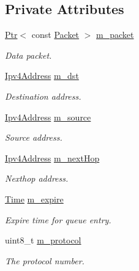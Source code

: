 \subsection*{Private Attributes}
\begin{DoxyCompactItemize}
\item 
\hyperlink{classns3_1_1Ptr}{Ptr}$<$ const \hyperlink{classns3_1_1Packet}{Packet} $>$ \hyperlink{classns3_1_1dsr_1_1DsrErrorBuffEntry_a5304a0bf201540812692d0249f5f96b6}{m\+\_\+packet}
\begin{DoxyCompactList}\small\item\em Data packet. \end{DoxyCompactList}\item 
\hyperlink{classns3_1_1Ipv4Address}{Ipv4\+Address} \hyperlink{classns3_1_1dsr_1_1DsrErrorBuffEntry_aa8ae0568bc601a36c89b65de468d238b}{m\+\_\+dst}
\begin{DoxyCompactList}\small\item\em Destination address. \end{DoxyCompactList}\item 
\hyperlink{classns3_1_1Ipv4Address}{Ipv4\+Address} \hyperlink{classns3_1_1dsr_1_1DsrErrorBuffEntry_aa27198f2b94226c5a1a5fa30da020e9b}{m\+\_\+source}
\begin{DoxyCompactList}\small\item\em Source address. \end{DoxyCompactList}\item 
\hyperlink{classns3_1_1Ipv4Address}{Ipv4\+Address} \hyperlink{classns3_1_1dsr_1_1DsrErrorBuffEntry_a266b1194986a8f3fd6ff3fb86a7913f0}{m\+\_\+next\+Hop}
\begin{DoxyCompactList}\small\item\em Nexthop address. \end{DoxyCompactList}\item 
\hyperlink{classns3_1_1Time}{Time} \hyperlink{classns3_1_1dsr_1_1DsrErrorBuffEntry_ad6526447139c2f10fff72be96f34db39}{m\+\_\+expire}
\begin{DoxyCompactList}\small\item\em Expire time for queue entry. \end{DoxyCompactList}\item 
uint8\+\_\+t \hyperlink{classns3_1_1dsr_1_1DsrErrorBuffEntry_ad61b1883e78aaa95f4f0fa0dae7920f6}{m\+\_\+protocol}
\begin{DoxyCompactList}\small\item\em The protocol number. \end{DoxyCompactList}\end{DoxyCompactItemize}


